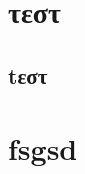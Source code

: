 \documentclass{ntualab}
\begin{document}
\maketitle
\tableofcontents
    \chapter{τεστ}
    \section{tεστ}
    \chapter{fsgsd}
\end{document}
